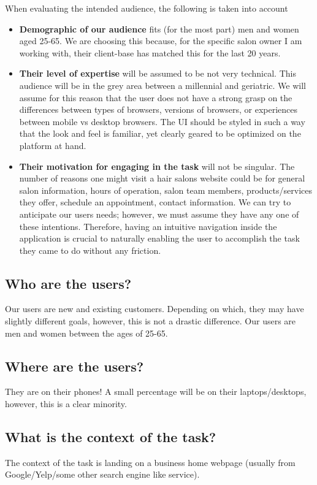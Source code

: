 When evaluating the intended audience, the following is taken into account

\begin{itemize}
\item
  \textbf{Demographic of our audience} fits (for the most part) men and women aged 25-65. We are choosing this because, for the specific salon owner I am working with, their client-base has matched this for the last 20 years.
\item
  \textbf{Their level of expertise} will be assumed to be not very technical. This audience will be in the grey area between a millennial and geriatric. We will assume for this reason that the user does not have a strong grasp on the differences between types of browsers, versions of browsers, or experiences between mobile vs desktop browsers. The UI should be styled in such a way that the look and feel is familiar, yet clearly geared to be optimized on the platform at hand.
\item
  \textbf{Their motivation for engaging in the task} will not be singular. The number of reasons one might visit a hair salons website could be for general salon information, hours of operation, salon team members, products/services they offer, schedule an appointment, contact information. We can try to anticipate our users needs; however, we must assume they have any one of these intentions. Therefore, having an intuitive navigation inside the application is crucial to naturally enabling the user to accomplish the task they came to do without any friction.
\end{itemize}

\subsection{Who are the users?}
Our users are new and existing customers. Depending on which, they may have slightly different goals, however, this is not a drastic difference. Our users are men and women between the ages of 25-65.

\subsection{Where are the users?}
They are on their phones! A small percentage will be on their laptops/desktops, however, this is a clear minority.

\subsection{What is the context of the task?}
The context of the task is landing on a business home webpage (usually from Google/Yelp/some other search engine like service).

